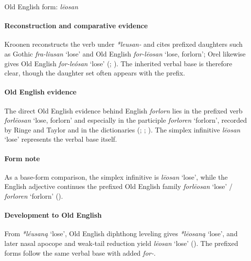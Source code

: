 \documentclass[
  british,
  a4paper,
]{article}
\providecommand{\Recon}[1]{\emph{*#1}}
\begin{document}
Old English form: \emph{lēosan}

\paragraph{Reconstruction and comparative
evidence}\label{reconstruction-and-comparative-evidence-25}

Kroonen reconstructs the verb under \emph{*leusan-} and cites prefixed
daughters such as Gothic \emph{fra-liusan} `lose' and Old English
\emph{for-lēosan} `lose, forlorn'; Orel likewise gives Old English
\emph{for-leósan} `lose' (;
). The inherited verbal base is
therefore clear, though the daughter set often appears with the prefix.

\paragraph{Old English evidence}\label{old-english-evidence-25}

The direct Old English evidence behind English \emph{forlorn} lies in
the prefixed verb \emph{forlēosan} `lose, forlorn' and especially in the
participle \emph{forloren} `forlorn', recorded by Ringe and Taylor and
in the dictionaries (; ;
). The
simplex infinitive \emph{lēosan} `lose' represents the verbal base
itself.

\paragraph{Form note}\label{form-note-2}

As a base-form comparison, the simplex infinitive is \emph{lēosan}
`lose', while the English adjective continues the prefixed Old English
family \emph{forlēosan} `lose' / \emph{forloren} `forlorn'
().

\paragraph{Development to Old
English}\label{development-to-old-english-25}

From \Recon{léusaną} `lose', Old English diphthong leveling gives
\Recon{lēosaną} `lose', and later nasal apocope and weak-tail reduction
yield \emph{lēosan} `lose' (). The prefixed forms follow the same verbal base with added
\emph{for-}.
\end{document}
